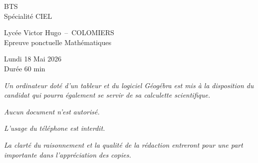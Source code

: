 \thispagestyle{empty}
    \begin{minipage}{0.22\linewidth}
    \begin{tcolorbox}[colback=white, title=, width=1\linewidth]	
        BTS  \\
        Spécialité CIEL 
    \end{tcolorbox}
\end{minipage}\hfill
\begin{minipage}{0.55\linewidth}
    \begin{tcolorbox}[colback=white, title=, width=1\linewidth]	
        \begin{center}
            Lycée Victor Hugo~--~COLOMIERS \\
            Epreuve ponctuelle Mathématiques
        \end{center}
        
    \end{tcolorbox}
\end{minipage}\hfill
\begin{minipage}{0.23\linewidth}
    \begin{tcolorbox}[colback=white, title=, width=1\linewidth]	
        \begin{center}
            Lundi 18 Mai 2026 \\
    Durée 60 min
        \end{center}
        
    \end{tcolorbox}
\end{minipage}\hfill

\vspace{2cm}

\NomPrenom{}

\vspace{2cm}

\begin{center}
    
\emph{Un ordinateur doté d'un tableur et du logiciel Géogébra est mis à la disposition du candidat qui pourra également se servir de sa calculette scientifique.}

\bigskip

\emph{Aucun document n'est autorisé.}

\bigskip

\emph{L'usage du téléphone est interdit.}

\bigskip

\emph{La clarté du raisonnement et la qualité de la rédaction entreront pour une part importante dans l'appréciation des copies.}

\end{center}

